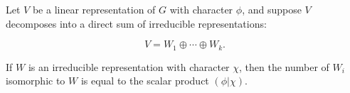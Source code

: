 Let $V$ be a linear representation of $G$ with character $\phi$, and suppose $V$ decomposes into a direct sum of irreducible representations:

$$V = W_1 \oplus \cdots \oplus W_k.$$

If $W$ is an irreducible representation with character $\chi$, then the number of $W_i$ isomorphic to $W$ is equal to the scalar product $(\phi|\chi)$.
